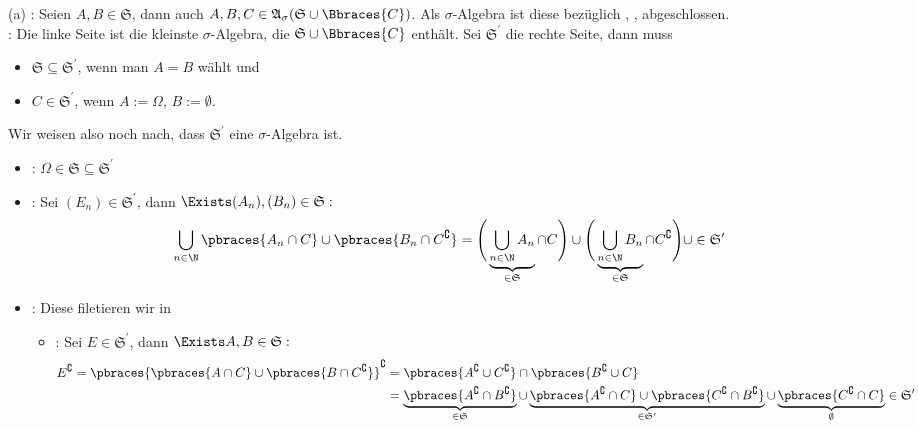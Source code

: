 \begin{solution}

(a) \Quote{$\supseteq$}: Seien $A, B \in \mathfrak{S}$, dann auch $A, B, C \in \mathfrak{A}_\sigma(\mathfrak{S} \cup \Bbraces{C})$. Als $\sigma$-Algebra ist diese bezüglich \Quote{$\cap$}, \Quote{$\cup$}, \Quote{$^\complement$} abgeschlossen. \\

\Quote{$\subseteq$}: Die linke Seite ist die kleinste $\sigma$-Algebra, die $\mathfrak{S} \cup \Bbraces{C}$ enthält. Sei $\mathfrak{S}^\prime$ die rechte Seite, dann muss

\begin{itemize}
  \item $\mathfrak{S} \subseteq \mathfrak{S}^\prime$, wenn man $A = B$ wählt und
  \item $C \in \mathfrak{S}^\prime$, wenn $A := \Omega$, $B := \emptyset$.
\end{itemize}

Wir weisen also noch nach, dass $\mathfrak{S}^\prime$ eine $\sigma$-Algebra ist.

\begin{itemize}

  \item {}: $\Omega \in \mathfrak{S} \subseteq \mathfrak{S}^\prime$

  \item {}: Sei $(E_n) \in \mathfrak{S}^\prime$, dann $\Exists (A_n), (B_n) \in \mathfrak{S}:$
  \begin{align*}
    \bigcup_{n \in \N} \pbraces{A_n \cap C} \cup \pbraces{B_n \cap C^\complement} =
    \Bigg ( \underbrace{\bigcup_{n \in \N} A_n}_{\in \mathfrak{S}} \cap C \Bigg ) \cup
    \Bigg ( \underbrace{\bigcup_{n \in \N} B_n}_{\in \mathfrak{S}} \cap C^\complement \Bigg ) \cup
    \in \mathfrak{S}^\prime
  \end{align*}

  \item {}: Diese filetieren wir in
  \begin{itemize}

    \item {}: Sei $E \in \mathfrak{S}^\prime$, dann $\Exists A, B \in \mathfrak{S}:$
    \begin{align*}
      E^\complement
      = \pbraces{\pbraces{A \cap C} \cup \pbraces{B \cap C^\complement}}^\complement
      & = \pbraces{A^\complement \cup C^\complement} \cap \pbraces{B^\complement \cup C} \\
      & = \underbrace
          {
            \pbraces{A^\complement \cap B^\complement}
          }_{
            \in \mathfrak{S}
          } \cup
          \underbrace
          {
            \pbraces{A^\complement \cap C} \cup \pbraces{C^\complement \cap B^\complement}
          }_{
            \in \mathfrak{S}^\prime
          } \cup
          \underbrace
          {
            \pbraces{C^\complement \cap C}
          }_\emptyset
          \in \mathfrak{S}^\prime
    \end{align*}


\end{itemize}
\end{itemize}
\end{solution}
